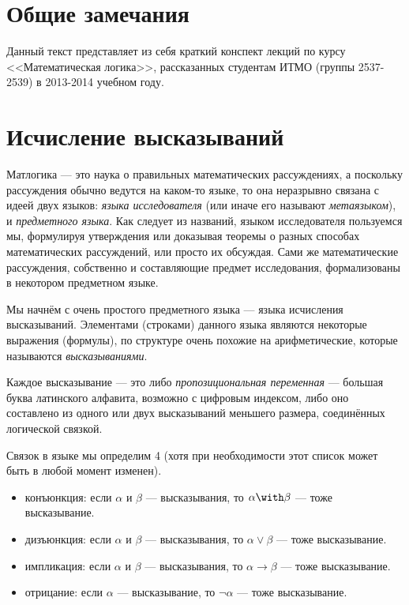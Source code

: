 \section{Общие замечания}

Данный текст представляет из себя краткий конспект лекций по курсу
<<Математическая логика>>, рассказанных студентам ИТМО (группы 2537-2539)
в 2013-2014 учебном году.

\section{Исчисление высказываний}

Матлогика --- это наука о правильных математических рассуждениях, а поскольку
рассуждения обычно ведутся на каком-то языке, то она неразрывно связана с идеей
двух языков: \emph{языка исследователя} (или иначе его называют \emph{метаязыком}),
и \emph{предметного языка}. Как следует из названий, языком исследователя 
пользуемся мы, формулируя утверждения или доказывая теоремы о разных способах
математических рассуждений, или просто их обсуждая. Сами же математические рассуждения,
собственно и составляющие предмет исследования, формализованы в некотором предметном 
языке.

Мы начнём с очень простого предметного языка --- языка исчисления высказываний.
Элементами (строками) данного языка являются некоторые выражения (формулы), по структуре
очень похожие на арифметические, которые называются \emph{высказываниями}.

Каждое высказывание --- это либо \emph{пропозициональная переменная} --- 
большая буква латинского алфавита, возможно с цифровым индексом, либо 
оно составлено из одного или двух высказываний меньшего размера, соединённых логической связкой.

Связок в языке мы определим 4 (хотя при необходимости этот список может быть
в любой момент изменен).
\begin{itemize}
\item конъюнкция: если $\alpha$ и $\beta$ --- высказывания, то $\alpha \with \beta$ --- тоже высказывание.
\item дизъюнкция: если $\alpha$ и $\beta$ --- высказывания, то $\alpha \vee \beta$ --- тоже высказывание.
\item импликация: если $\alpha$ и $\beta$ --- высказывания, то $\alpha \rightarrow \beta$ --- тоже высказывание.
\item отрицание: если $\alpha$ --- высказывание, то $\neg\alpha$ --- тоже высказывание.
\end{itemize}


